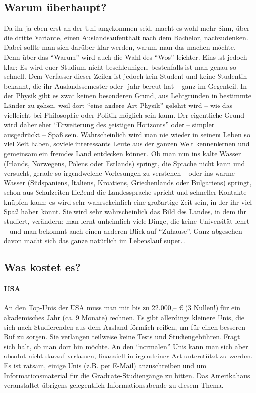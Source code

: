 \subsection{Warum überhaupt?}
Da ihr ja eben erst an der Uni angekommen seid, macht es wohl mehr Sinn, über die dritte Variante, einen Auslandsaufenthalt nach dem Bachelor, nachzudenken.
Dabei sollte man sich darüber klar werden, warum man das machen möchte.
Denn über das "`Warum"' wird auch die Wahl des "`Wos"' leichter.
Eins ist jedoch klar: Es wird euer Studium nicht beschleunigen, bestenfalls ist man genau so schnell.
Dem Verfasser dieser Zeilen ist jedoch kein Student und keine Studentin bekannt, die ihr Auslandssemester oder -jahr bereut hat -- ganz im Gegenteil.
In der Physik gibt es zwar keinen besonderen Grund, aus Lehrgründen in bestimmte Länder zu gehen,
weil dort "`eine andere Art Physik"' gelehrt wird -- wie das vielleicht bei Philosophie oder Politik möglich sein kann.
Der eigentliche Grund wird daher eher "`Erweiterung des geistigen Horizonts"'
oder -- simpler ausgedrückt -- Spaß sein.
Wahrscheinlich wird man nie wieder in seinem Leben so viel Zeit haben, soviele interessante Leute aus der ganzen Welt kennenlernen und gemeinsam ein fremdes Land entdecken können.
Ob man nun ins kalte Wasser (Irlands, Norwegens, Polens oder Estlands) springt, die Sprache nicht kann
und versucht, gerade so irgendwelche Vorlesungen zu verstehen -- oder ins warme Wasser (Südspaniens, Italiens, Kroatiens, Griechenlands oder Bulgariens) springt,
schon aus Schulzeiten fließend die Landessprache spricht und schneller Kontakte knüpfen kann:
es wird sehr wahrscheinlich eine großartige Zeit sein, in der ihr viel Spaß haben könnt.
Sie wird sehr wahrscheinlich das Bild des Landes, in dem ihr studiert, verändern;
man lernt unheimlich viele Dinge, die keine Universität lehrt --
und man bekommt auch einen anderen Blick auf "`Zuhause"'.
Ganz abgesehen davon macht sich das ganze natürlich im Lebenslauf super...
%
\subsection{Was kostet es?}
\paragraph{USA} An den Top-Unis der USA muss man mit bis zu 22.000,-- \euro{} (3 Nullen!) für ein akademisches Jahr (ca. 9 Monate) rechnen. Es gibt allerdings kleinere Unis, die sich nach Studierenden aus dem Ausland förmlich reißen, um für einen besseren Ruf zu sorgen. Sie verlangen teilweise keine Tests und Studiengebühren. Fragt sich halt, ob man dort hin möchte. An den "`normalen"' Unis kann man sich aber absolut nicht darauf verlassen, finanziell in irgendeiner Art unterstützt zu werden. Es ist ratsam, einige Unis (z.B. per E-Mail) anzuschreiben und um Informationsmaterial für die Graduate-Studiengänge zu bitten. Das Amerikahaus veranstaltet übrigens gelegentlich Informationsabende zu diesem Thema.

